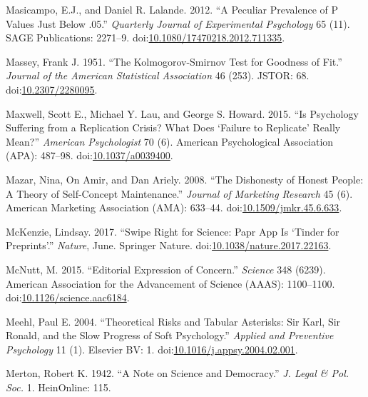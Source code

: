 \documentclass[a5paper]{book}
\begin{document}
\hypertarget{ref-doi:10.1080ux2f17470218.2012.711335}{}
Masicampo, E.J., and Daniel R. Lalande. 2012. ``A Peculiar Prevalence of
P Values Just Below .05.'' \emph{Quarterly Journal of Experimental
Psychology} 65 (11). SAGE Publications: 2271--9.
doi:\href{https://doi.org/10.1080/17470218.2012.711335}{10.1080/17470218.2012.711335}.

\hypertarget{ref-doi:10.2307ux2f2280095}{}
Massey, Frank J. 1951. ``The Kolmogorov-Smirnov Test for Goodness of
Fit.'' \emph{Journal of the American Statistical Association} 46 (253).
JSTOR: 68. doi:\href{https://doi.org/10.2307/2280095}{10.2307/2280095}.

\hypertarget{ref-doi:10.1037ux2fa0039400}{}
Maxwell, Scott E., Michael Y. Lau, and George S. Howard. 2015. ``Is
Psychology Suffering from a Replication Crisis? What Does `Failure to
Replicate' Really Mean?'' \emph{American Psychologist} 70 (6). American
Psychological Association (APA): 487--98.
doi:\href{https://doi.org/10.1037/a0039400}{10.1037/a0039400}.

\hypertarget{ref-doi:10.1509ux2fjmkr.45.6.633}{}
Mazar, Nina, On Amir, and Dan Ariely. 2008. ``The Dishonesty of Honest
People: A Theory of Self-Concept Maintenance.'' \emph{Journal of
Marketing Research} 45 (6). American Marketing Association (AMA):
633--44.
doi:\href{https://doi.org/10.1509/jmkr.45.6.633}{10.1509/jmkr.45.6.633}.

\hypertarget{ref-doi:10.1038ux2fnature.2017.22163}{}
McKenzie, Lindsay. 2017. ``Swipe Right for Science: Papr App Is `Tinder
for Preprints'.'' \emph{Nature}, June. Springer Nature.
doi:\href{https://doi.org/10.1038/nature.2017.22163}{10.1038/nature.2017.22163}.

\hypertarget{ref-doi:10.1126ux2fscience.aac6184}{}
McNutt, M. 2015. ``Editorial Expression of Concern.'' \emph{Science} 348
(6239). American Association for the Advancement of Science (AAAS):
1100--1100.
doi:\href{https://doi.org/10.1126/science.aac6184}{10.1126/science.aac6184}.

\hypertarget{ref-doi:10.1016ux2fj.appsy.2004.02.001}{}
Meehl, Paul E. 2004. ``Theoretical Risks and Tabular Asterisks: Sir
Karl, Sir Ronald, and the Slow Progress of Soft Psychology.''
\emph{Applied and Preventive Psychology} 11 (1). Elsevier BV: 1.
doi:\href{https://doi.org/10.1016/j.appsy.2004.02.001}{10.1016/j.appsy.2004.02.001}.

\hypertarget{ref-merton1942}{}
Merton, Robert K. 1942. ``A Note on Science and Democracy.'' \emph{J.
Legal \& Pol. Soc.} 1. HeinOnline: 115.
\end{document}
